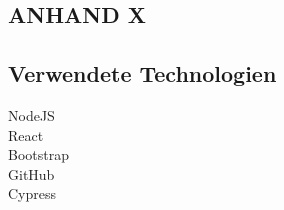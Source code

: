 \subsection{ANHAND X}\label{subsec_UabsAnhang}

\subsection{Verwendete Technologien}\label{subsec_UabsAnhang}
NodeJS
\\
React
\\
Bootstrap
\\
GitHub
\\
Cypress
